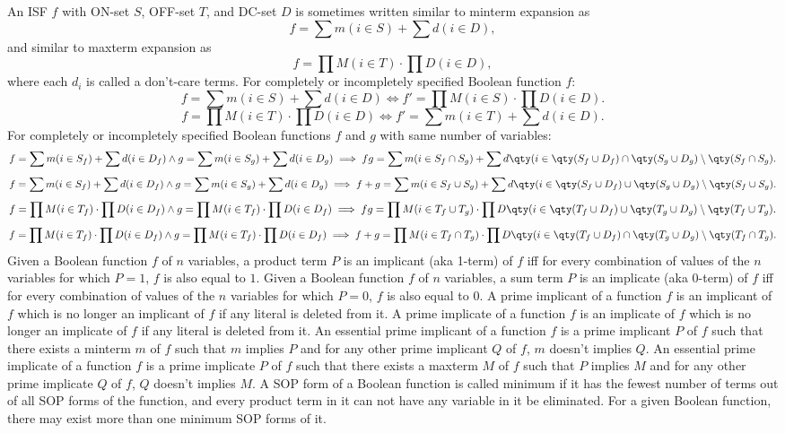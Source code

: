 \documentclass[a4paper,12pt]{article}
\begin{document}
\begin{itemize}
\begin{itemize}
\begin{itemize}
\begin{itemize}
\begin{itemize}
\begin{itemize}
\begin{itemize}
An ISF $f$ with ON-set $S$, OFF-set $T$, and DC-set $D$ is sometimes written similar to minterm expansion as
\[f=\sum m(i\in S)+\sum d(i\in D),\]
and similar to maxterm expansion as
\[f=\prod M(i\in T)\cdot\prod D(i\in D),\]
where each $d_i$ is called a don't-care terms.
For completely or incompletely specified Boolean function $f$:
\[f=\sum m(i\in S)+\sum d(i\in D)\iff f'=\prod M(i\in S)\cdot\prod D(i\in D).\]
\[f=\prod M(i\in T)\cdot\prod D(i\in D)\iff f'=\sum m(i\in T)+\sum d(i\in D).\]
For completely or incompletely specified Boolean functions $f$ and $g$ with same number of variables:
\[f=\sum m(i\in S_f)+\sum d(i\in D_f)\land g=\sum m(i\in S_g)+\sum d(i\in D_g)\implies fg=\sum m(i\in S_f\cap S_g)+\sum d\qty(i\in\qty(S_f\cup D_f)\cap\qty(S_g\cup D_g)\setminus\qty(S_f\cap S_g).\]
\[f=\sum m(i\in S_f)+\sum d(i\in D_f)\land g=\sum m(i\in S_g)+\sum d(i\in D_g)\implies f+g=\sum m(i\in S_f\cup S_g)+\sum d\qty(i\in\qty(S_f\cup D_f)\cup\qty(S_g\cup D_g)\setminus\qty(S_f\cup S_g).\]
\[f=\prod M(i\in T_f)\cdot\prod D(i\in D_f)\land g=\prod M(i\in T_f)\cdot\prod D(i\in D_f)\implies fg=\prod M(i\in T_f\cup T_g)\cdot\prod D\qty(i\in\qty(T_f\cup D_f)\cup\qty(T_g\cup D_g)\setminus\qty(T_f\cup T_g).\]
\[f=\prod M(i\in T_f)\cdot\prod D(i\in D_f)\land g=\prod M(i\in T_f)\cdot\prod D(i\in D_f)\implies f+g=\prod M(i\in T_f\cap T_g)\cdot\prod D\qty(i\in\qty(T_f\cup D_f)\cap\qty(T_g\cup D_g)\setminus\qty(T_f\cap T_g).\]
Given a Boolean function $f$ of $n$ variables, a product term $P$ is an implicant (aka 1-term) of $f$ iff for every combination of values of the $n$ variables for which $P = 1$, $f$ is also equal to $1$.
Given a Boolean function $f$ of $n$ variables, a sum term $P$ is an implicate (aka 0-term) of $f$ iff for every combination of values of the $n$ variables for which $P = 0$, $f$ is also equal to $0$.
A prime implicant of a function $f$ is an implicant of $f$ which is no longer an implicant of $f$ if any literal is deleted from it.
A prime implicate of a function $f$ is an implicate of $f$ which is no longer an implicate of $f$ if any literal is deleted from it.
An essential prime implicant of a function $f$ is a prime implicant $P$ of $f$ such that there exists a minterm $m$ of $f$ such that $m$ implies $P$ and for any other prime implicant $Q$ of $f$, $m$ doesn't implies $Q$.
An essential prime implicate of a function $f$ is a prime implicate $P$ of $f$ such that there exists a maxterm $M$ of $f$ such that $P$ implies $M$ and for any other prime implicate $Q$ of $f$, $Q$ doesn't implies $M$.
A SOP form of a Boolean function is called minimum if it has the fewest number of terms out of all SOP forms of the function, and every product term in it can not have any variable in it be eliminated. For a given Boolean function, there may exist more than one minimum SOP forms of it.


\end{itemize}
\end{itemize}
\end{itemize}
\end{itemize}
\end{itemize}
\end{itemize}
\end{itemize}
\end{document}
